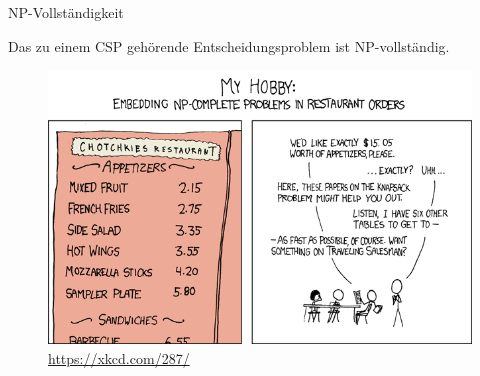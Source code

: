 \begin{frame}{NP-Vollständigkeit}
\begin{theorem}
Das zu einem CSP gehörende Entscheidungsproblem ist NP-vollständig.
\end{theorem}

\begin{center}
\begin{figure}
\includegraphics[width=.8\textwidth]{img/np_complete.png}
\caption{\url{https://xkcd.com/287/} }
\end{figure}
\end{center}
\end{frame}

